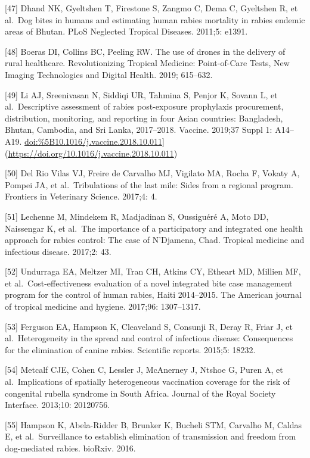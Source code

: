 \documentclass[
]{book}
\begin{document}
{[}47{]} Dhand NK, Gyeltshen T, Firestone S, Zangmo C, Dema C, Gyeltshen R,
et al.~Dog bites in humans and estimating human rabies mortality in
rabies endemic areas of Bhutan. PLoS Neglected Tropical Diseases.
2011;5: e1391.

{[}48{]} Boeras DI, Collins BC, Peeling RW. The use of drones in the
delivery of rural healthcare. Revolutionizing Tropical Medicine:
Point-of-Care Tests, New Imaging Technologies and Digital Health. 2019;
615--632.

{[}49{]} Li AJ, Sreenivasan N, Siddiqi UR, Tahmina S, Penjor K, Sovann L, et
al.~Descriptive assessment of rabies post-exposure prophylaxis
procurement, distribution, monitoring, and reporting in four Asian
countries: Bangladesh, Bhutan, Cambodia, and Sri Lanka, 2017--2018.
Vaccine. 2019;37 Suppl 1: A14--A19.
\url{doi:\%5B10.1016/j.vaccine.2018.10.011}{]}(\url{https://doi.org/10.1016/j.vaccine.2018.10.011})

{[}50{]} Del Rio Vilas VJ, Freire de Carvalho MJ, Vigilato MA, Rocha F,
Vokaty A, Pompei JA, et al.~Tribulations of the last mile: Sides from a
regional program. Frontiers in Veterinary Science. 2017;4: 4.

{[}51{]} Lechenne M, Mindekem R, Madjadinan S, Oussiguéré A, Moto DD,
Naissengar K, et al.~The importance of a participatory and integrated
one health approach for rabies control: The case of N'Djamena, Chad.
Tropical medicine and infectious disease. 2017;2: 43.

{[}52{]} Undurraga EA, Meltzer MI, Tran CH, Atkins CY, Etheart MD, Millien
MF, et al.~Cost-effectiveness evaluation of a novel integrated bite case
management program for the control of human rabies, Haiti 2014--2015.
The American journal of tropical medicine and hygiene. 2017;96:
1307--1317.

{[}53{]} Ferguson EA, Hampson K, Cleaveland S, Consunji R, Deray R, Friar J,
et al.~Heterogeneity in the spread and control of infectious disease:
Consequences for the elimination of canine rabies. Scientific reports.
2015;5: 18232.

{[}54{]} Metcalf CJE, Cohen C, Lessler J, McAnerney J, Ntshoe G, Puren A, et
al.~Implications of spatially heterogeneous vaccination coverage for the
risk of congenital rubella syndrome in South Africa. Journal of the
Royal Society Interface. 2013;10: 20120756.

{[}55{]} Hampson K, Abela-Ridder B, Brunker K, Bucheli STM, Carvalho M,
Caldas E, et al.~Surveillance to establish elimination of transmission
and freedom from dog-mediated rabies. bioRxiv. 2016.
\end{document}
